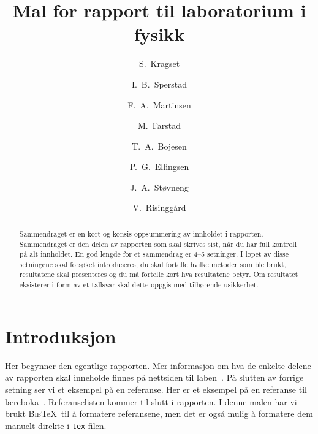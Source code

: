\begin{frontmatter}

\title{Mal for rapport til laboratorium i fysikk}

\author[fysikk]{S.~Kragset}
\author[fysikk]{I.~B.~Sperstad}
\author[fysikk]{F.~A.~Martinsen}
\author[fysikk]{M.~Farstad}
\author[fysikk]{T.~A.~Bojesen}
\author[fysikk]{P.~G.~Ellingsen}
\author[fysikk]{J.~A.~Støvneng}
\author[fysikk]{V.~Risinggård}
\address[fysikk]{Institutt for fysikk, Norges teknisk-naturvitenskapelige universitet, 7491 Trondheim.}

\begin{abstract}
Sammendraget er en kort og konsis oppsummering av innholdet i rapporten. Sammendraget er den delen av rapporten som skal skrives sist, når du har full kontroll på alt innholdet. En god lengde for et sammendrag er 4--5 setninger. I løpet av disse setningene skal forsøket introduseres, du skal fortelle hvilke metoder som ble brukt, resultatene skal presenteres og du må fortelle kort hva resultatene betyr. Om resultatet eksisterer i form av et tallsvar skal dette oppgis med tilhørende usikkerhet. 
\end{abstract}

\end{frontmatter}


\section{Introduksjon}
Her begynner den egentlige rapporten. Mer informasjon om hva de enkelte delene av rapporten skal inneholde finnes på nettsiden til laben~\cite{labside}. På slutten av forrige setning ser vi et eksempel på en referanse. Her er et eksempel på en referanse til læreboka~\cite{Young2016}. Referanselisten kommer til slutt i rapporten. I denne malen har vi brukt \textsc{Bib}\TeX\ til å formatere referansene, men det er også mulig å formatere dem manuelt direkte i \texttt{tex}-filen. 


